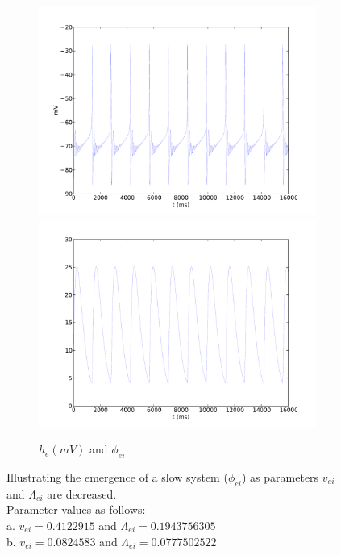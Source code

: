 \documentclass[a4paper,12pt]{article}
\begin{document}
\begin{figure}
	\begin{subfigure}[b]{1\textwidth}
		\includegraphics[scale=0.32]{chosen-frontiers-2012/00214-1-0_1-5-0_1-he-phi.pdf}
		\includegraphics[scale=0.32]{chosen-frontiers-2012/00214-1-0_1-5-0_1-phi_ei-phi}
		\caption{$h_e (mV)$ and $\phi_{ei}$}
	\end{subfigure}
	\label{fig:phi_dyn}
	\caption{Illustrating the emergence of a slow system ($\phi_{ei}$) as parameters $v_{ei}$ and $\Lambda_{ei}$ are decreased. \\
	Parameter values as follows:\\
	a. $v_{ei} = 0.4122915$ and $\Lambda_{ei} = 0.1943756305$\\
	b. $v_{ei} = 0.0824583$ and $\Lambda_{ei} = 0.0777502522$\\
}
\end{figure}
\end{document}
